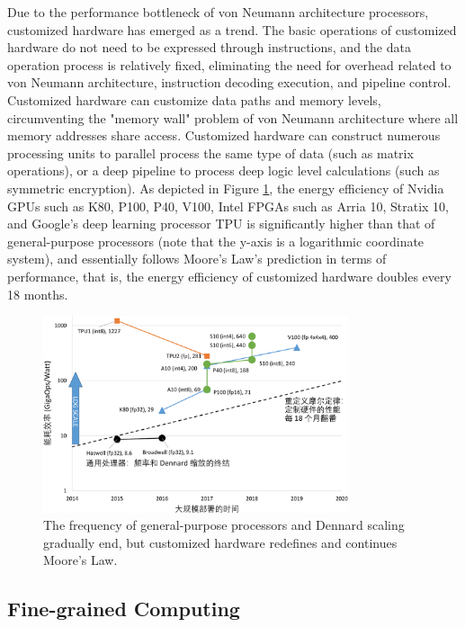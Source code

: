 Due to the performance bottleneck of von Neumann architecture processors, customized hardware has emerged as a trend. The basic operations of customized hardware do not need to be expressed through instructions, and the data operation process is relatively fixed, eliminating the need for overhead related to von Neumann architecture, instruction decoding execution, and pipeline control. Customized hardware can customize data paths and memory levels, circumventing the "memory wall" problem of von Neumann architecture where all memory addresses share access. Customized hardware can construct numerous processing units to parallel process the same type of data (such as matrix operations), or a deep pipeline to process deep logic level calculations (such as symmetric encryption). As depicted in Figure \ref{background:fig:moores_law_redefined}, the energy efficiency of Nvidia GPUs such as K80, P100, P40, V100, Intel FPGAs such as Arria 10, Stratix 10, and Google's deep learning processor TPU is significantly higher than that of general-purpose processors (note that the y-axis is a logarithmic coordinate system), and essentially follows Moore's Law's prediction in terms of performance, that is, the energy efficiency of customized hardware doubles every 18 months.

\begin{figure}[htbp]
	\centering
	\includegraphics[width=0.8\textwidth]{figures/moores_law_redefined.pdf}
	\caption{The frequency of general-purpose processors and Dennard scaling gradually end, but customized hardware redefines and continues Moore's Law.}
	\label{background:fig:moores_law_redefined}
\end{figure}

\subsection{Fine-grained Computing}
\label{background:sec:datacenter-granular}

